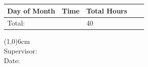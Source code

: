 \documentclass{article}
\begin{document}
\vspace{1mm}
\begin{table}[htbp]
\begin{tabular}{ | C{2cm}| C{1.75cm} | C{1cm} |  L{12.5cm} | N}
\hline
Day of Month & Time & Total Hours & & \\ \hline

Total: & & 40 & \\ \hline
\end{tabular}
\label{tab:table}
\end{table}

\vspace{2.5cm}
\noindent \line(1,0){6cm} \\
Supervisor: \\
Date:
\end{document}
